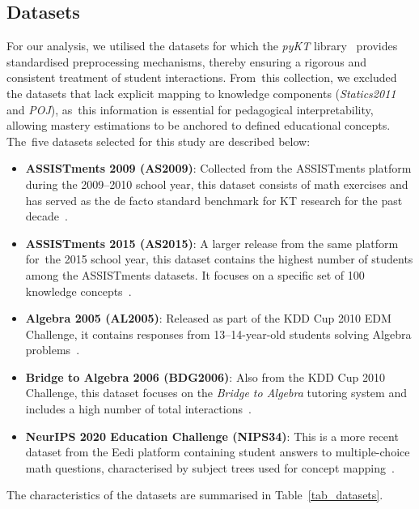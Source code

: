 \documentclass[applsci,article,accept,moreauthors,pdftex]{Definitions/mdpi}
\begin{document}
\subsection{Datasets}\label{sec_dataset}

{For our analysis, we utilised the datasets for which the \textit{pyKT} library~\citep{liu2022pykt} provides standardised preprocessing mechanisms, thereby ensuring a rigorous and consistent treatment of student interactions. From~this collection, we excluded the datasets that lack explicit mapping to knowledge components (\textit{Statics2011} and \textit{POJ}), as~this information is essential for pedagogical interpretability, allowing mastery estimations to be anchored to defined educational concepts. The~five datasets selected for this study are described below:}
 
\begin{itemize}
    \item \textbf{ASSISTments 2009 (AS2009)}: Collected from the ASSISTments platform during the 2009--2010 school year, this dataset consists of math exercises and has served as the de facto standard benchmark for KT research for the past decade~\citep{feng2009addressing}.
    \item \textbf{ASSISTments 2015 (AS2015)}: A larger release from the same platform for~the 2015 school year, this dataset contains the highest number of students among the ASSISTments datasets. It focuses on a specific set of 100 knowledge concepts~\citep{feng2009addressing}.
    \item \textbf{Algebra 2005 (AL2005)}: Released as part of the KDD Cup 2010 EDM Challenge, it contains responses from 13--14-year-old students solving Algebra problems~\citep{stamper2010algebra}.
    \item \textbf{Bridge to Algebra 2006 (BDG2006)}: Also from the KDD Cup 2010 Challenge, this dataset focuses on the \textit{Bridge to Algebra} tutoring system and includes a high number of total interactions~\citep{stamper2010algebra}.
    \item \textbf{NeurIPS 2020 Education Challenge (NIPS34)}: This is a more recent dataset from the Eedi platform containing student answers to multiple-choice math questions, {characterised by subject trees} used for concept mapping~\citep{wang2020instructions}.
\end{itemize}

The characteristics of the datasets are {summarised} in Table~\ref{tab_datasets}.
\end{document}
